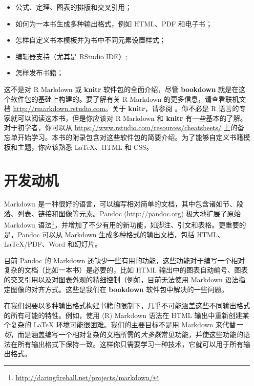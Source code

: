 \documentclass[
  12pt,
]{krantz}
\providecommand{\tightlist}{%
  \setlength{\itemsep}{0pt}\setlength{\parskip}{0pt}}
\renewcommand{\href}[2]{#2\footnote{\url{#1}}}
\theoremstyle{definition}
\theoremstyle{definition}
\theoremstyle{definition}
\theoremstyle{definition}
\theoremstyle{remark}
\begin{document}
\begin{itemize}
\tightlist
\item
  公式、定理、图表的排版和交叉引用；
\item
  如何为一本书生成多种输出格式，例如 HTML、PDF 和电子书；
\item
  怎样自定义书本模板并为书中不同元素设置样式；
\item
  编辑器支持（尤其是 RStudio IDE）;
\item
  怎样发布书籍；
\end{itemize}

这不是对 R Markdown 或 \textbf{knitr} 软件包\citep{R-knitr}的全面介绍，尽管 \textbf{bookdown} 就是在这个软件包的基础上构建的。要了解有关 R Markdown 的更多信息，请查看联机文档 \url{http://rmarkdown.rstudio.com}。关于 \textbf{knitr}，请参阅 \citet{xie2015}。你不必是 R 语言\citep{R-base}的专家就可以阅读这本书，但是你应该对 R Markdown 和 \textbf{knitr} 有一些基本的了解。对于初学者，你可以从 \url{https://www.rstudio.com/resources/cheatsheets/} 上的备忘单开始学习。本书的附录包含对这些软件包的简要介绍。为了能够自定义书籍模板和主题，你应该熟悉 LaTeX、HTML 和 CSS。

\section{开发动机}\label{ux5f00ux53d1ux52a8ux673a}

Markdown 是一种很好的语言，可以编写相对简单的文档，其中包含诸如节、段落、列表、链接和图像等元素。Pandoc (\url{http://pandoc.org}) 极大地扩展了\href{http://daringfireball.net/projects/markdown/}{原始 Markdown 语法}，并增加了不少有用的新功能，如脚注、引文和表格。更重要的是，Pandoc 可以从 Markdown 生成多种格式的输出文档，包括 HTML、LaTeX/PDF、Word 和幻灯片。

目前 Pandoc 的 Markdown 还缺少一些有用的功能，这些功能对于编写一个相对复杂的文档（比如一本书）是必要的，比如 HTML 输出中的图表自动编号、图表的交叉引用以及对图表外观的精细控制（例如，目前无法使用 Markdown 语法指定图像的对齐方式。这些是我们在 \textbf{bookdown} 软件包中解决的一些问题。

在我们想要以多种输出格式构建书籍的限制下，几乎不可能涵盖这些不同输出格式的所有可能的特性。例如，使用 (R) Markdown 语法在 HTML 输出中重新创建某个复杂的 LaTeX 环境可能很困难。我们的主要目标不是用 Markdown 来代替\emph{一切}，而是涵盖编写一个相对复杂的文档所需的\emph{大多数}常见功能，并使这些功能的语法在所有输出格式下保持一致。这样你只需要学习一种技术，它就可以用于所有输出格式。
\end{document}
